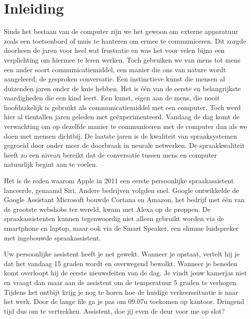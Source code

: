 
\chapter{Inleiding}
\label{ch:inleiding}
Sinds het bestaan van de computer zijn we het gewoon om externe apparatuur zoals een toetsenbord of muis te hanteren om ermee te communiceren. Dit zorgde doorheen de jaren voor heel wat frustratie en was het voor velen bijna een verplichting om hiermee te leren werken. Toch gebruiken we van mens tot mens een ander soort communicatiemiddel, een manier die ons van nature wordt aangeleerd, de gesproken conversatie.
Een instinctieve kunst die mensen al duizenden jaren onder de knie hebben. Het is één van de eerste en belangrijkste vaardigheden die een kind leert. Een kunst, eigen aan de mens, die nooit hoofdzakelijk is gebruikt als communicatiemiddel met een computer. Toch werd hier al tientallen jaren geleden met geëxperimenteerd. Vandaag de dag komt de verwachting om op dezelfde manier te communiceren met de computer dan als we doen met mensen dichtbij. De laatste jaren is de kwaliteit van spraaksystemen gegroeid door onder meer de doorbraak in neurale netwerken. De spraakkwaliteit heeft zo een niveau bereikt dat de conversatie tussen mens en computer natuurlijk begint aan te voelen.

Het is de reden waarom Apple in 2011 een eerste persoonlijke spraakassistent lanceerde, genaamd Siri. Andere bedrijven volgden snel. Google ontwikkelde de Google Assistant Microsoft bouwde Cortana en Amazon, het bedrijf met één van de grootste webshobs ter wereld, kwam met Alexa op de proppen. De spraakassistenten kunnen tegenwoordig niet alleen gebruikt worden via de smartphone en laptop, maar ook via de Smart Speaker, een slimme luidspreker met ingebouwde spraakassistent.

Uw persoonlijke assistent heeft je net gewekt. Wanneer je opstaat, vertelt hij je dat het vandaag 15 graden wordt en overwegend bewolkt. Wanneer je beneden komt overloopt hij de eerste nieuwsfeiten van de dag. Je vindt jouw kamerjas niet en vraagt dan maar aan de assistent om de temperatuur 5 graden te verhogen. Tijdens het ontbijt krijg je nog te horen hoe de huidige verkeerssituatie is naar het werk. Door de lange file ga je pas om 09.07u toekomen op kantoor. Dringend tijd dus om te vertrekken. Assistent, doe jij even de deur voor me op slot?

